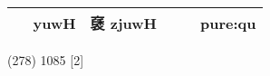 \documentclass[14pt,a4paper]{scrartcl}
\begin{document}
\begin{longtable}[c]{@{}llllll@{}}
\begin{minipage}[t]{0.14\columnwidth}\raggedright\strut
𥝩
\strut\end{minipage} &
\begin{minipage}[t]{0.14\columnwidth}\raggedright\strut
yuwH
\strut\end{minipage} &
\begin{minipage}[t]{0.14\columnwidth}\raggedright\strut
褎 zjuwH
\strut\end{minipage} &
\begin{minipage}[t]{0.14\columnwidth}\raggedright\strut
\strut\end{minipage} &
\begin{minipage}[t]{0.14\columnwidth}\raggedright\strut
\strut\end{minipage} &
\begin{minipage}[t]{0.14\columnwidth}\raggedright\strut
pure:qu
\strut\end{minipage}\tabularnewline
\bottomrule
\end{longtable}

(278) 1085 {[}2{]}
\end{document}
